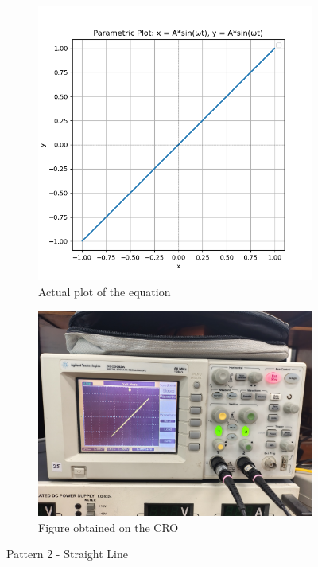 \documentclass[12pt]{article}
\begin{document}
\begin{figure}[htbp]
    \centering
    \begin{subfigure}[b]{0.45\textwidth}
        \centering
        \includegraphics[width=\textwidth]{figs/Experiment-1/Observation-2/Figure_1.jpg}
        \caption{Actual plot of the equation}
    \end{subfigure}
    \hfill
    \begin{subfigure}[b]{0.45\textwidth}
        \centering
        \includegraphics[width=\textwidth]{figs/Experiment-1/Observation-2/Figure_2.png}
        \caption{Figure obtained on the CRO}
    \end{subfigure}
    \caption{Pattern 2 - Straight Line}
\end{figure}
\end{document}
